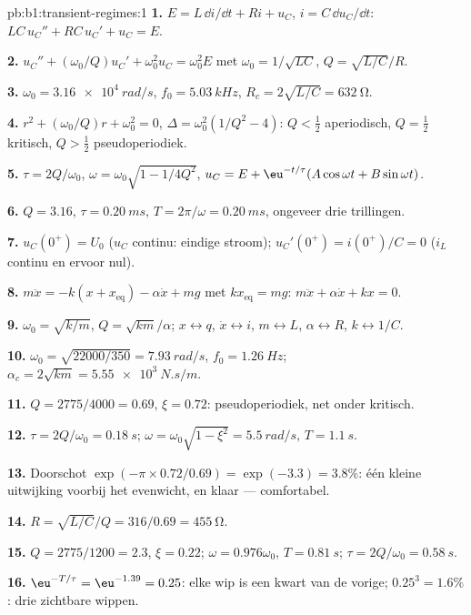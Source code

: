 \begin{solution}{pb:b1:transient-regimes:1}
\textbf{1.} $E = L\,\dd i/\dd t + Ri + u_C$, $i = C\,\dd u_C/\dd t$:
$LC\,u_C'' + RC\,u_C' + u_C = E$.

\textbf{2.} $u_C'' + (\omega_0/Q)u_C' + \omega_0^2u_C = \omega_0^2E$ met
$\omega_0 = 1/\sqrt{LC}$, $Q = \sqrt{L/C}/R$.

\textbf{3.} $\omega_0 = \qty{3.16e4}{rad/s}$, $f_0 = \qty{5.03}{kHz}$,
$R_c = 2\sqrt{L/C} = \qty{632}{\ohm}$.

\textbf{4.} $r^2 + (\omega_0/Q)r + \omega_0^2 = 0$, $\Delta = \omega_0^2(1/Q^2
- 4)$: $Q < \tfrac12$ aperiodisch, $Q = \tfrac12$ kritisch, $Q > \tfrac12$
pseudoperiodiek.

\textbf{5.} $\tau = 2Q/\omega_0$, $\omega = \omega_0\sqrt{1 - 1/4Q^2}$,
$u_C = E + \eu^{-t/\tau}(A\cos\omega t + B\sin\omega t)$.

\textbf{6.} $Q = 3.16$, $\tau = \qty{0.20}{ms}$, $T = 2\pi/\omega =
\qty{0.20}{ms}$, ongeveer drie trillingen.

\textbf{7.} $u_C(0^+) = U_0$ ($u_C$ continu: eindige stroom);
$u_C'(0^+) = i(0^+)/C = 0$ ($i_L$ continu en ervoor nul).

\textbf{8.} $m\ddot x = -k(x + x_{\text{eq}}) - \alpha\dot x + mg$ met
$kx_{\text{eq}} = mg$: $m\ddot x + \alpha\dot x + kx = 0$.

\textbf{9.} $\omega_0 = \sqrt{k/m}$, $Q = \sqrt{km}/\alpha$; $x \leftrightarrow
q$, $\dot x \leftrightarrow i$, $m \leftrightarrow L$, $\alpha \leftrightarrow
R$, $k \leftrightarrow 1/C$.

\textbf{10.} $\omega_0 = \sqrt{22000/350} = \qty{7.93}{rad/s}$, $f_0 =
\qty{1.26}{Hz}$; $\alpha_c = 2\sqrt{km} = \qty{5.55e3}{N.s/m}$.

\textbf{11.} $Q = 2775/4000 = 0.69$, $\xi = 0.72$: pseudoperiodiek, net
onder kritisch.

\textbf{12.} $\tau = 2Q/\omega_0 = \qty{0.18}{s}$; $\omega = \omega_0\sqrt{1
- \xi^2} = \qty{5.5}{rad/s}$, $T = \qty{1.1}{s}$.

\textbf{13.} Doorschot $\exp(-\pi \times 0.72/0.69) = \exp(-3.3) = 3.8\%$:
één kleine uitwijking voorbij het evenwicht, en klaar --- comfortabel.

\textbf{14.} $R = \sqrt{L/C}/Q = 316/0.69 = \qty{455}{\ohm}$.

\textbf{15.} $Q = 2775/1200 = 2.3$, $\xi = 0.22$; $\omega = 0.976\omega_0$,
$T = \qty{0.81}{s}$; $\tau = 2Q/\omega_0 = \qty{0.58}{s}$.

\textbf{16.} $\eu^{-T/\tau} = \eu^{-1.39} = 0.25$: elke wip is een
kwart van de vorige; $0.25^3 = 1.6\%$: drie zichtbare wippen.


\end{solution}
